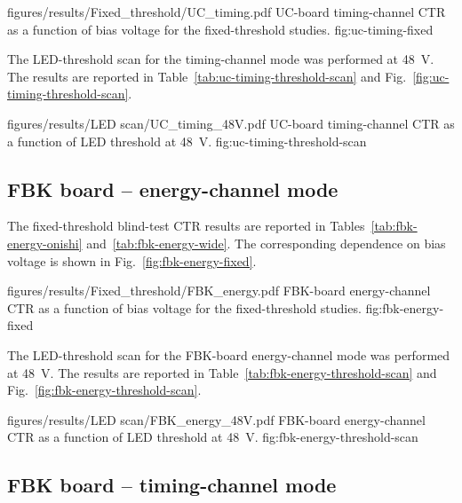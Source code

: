 



\reportfigure
    {figures/results/Fixed_threshold/UC_timing.pdf}
    {UC-board timing-channel CTR as a function of bias voltage for the fixed-threshold studies.}
    {fig:uc-timing-fixed}

The LED-threshold scan for the timing-channel mode was performed at \SI{48}{V}. The results are reported in Table~\ref{tab:uc-timing-threshold-scan} and Fig.~\ref{fig:uc-timing-threshold-scan}.



\reportfigure
    {figures/results/LED scan/UC_timing_48V.pdf}
    {UC-board timing-channel CTR as a function of LED threshold at \SI{48}{V}.}
    {fig:uc-timing-threshold-scan}


\subsection{FBK board -- energy-channel mode}

The fixed-threshold blind-test CTR results are reported in Tables~\ref{tab:fbk-energy-onishi} and~\ref{tab:fbk-energy-wide}. The corresponding dependence on bias voltage is shown in Fig.~\ref{fig:fbk-energy-fixed}.





\reportfigure
    {figures/results/Fixed_threshold/FBK_energy.pdf}
    {FBK-board energy-channel CTR as a function of bias voltage for the fixed-threshold studies.}
    {fig:fbk-energy-fixed}

The LED-threshold scan for the FBK-board energy-channel mode was performed at \SI{48}{V}. The results are reported in Table~\ref{tab:fbk-energy-threshold-scan} and Fig.~\ref{fig:fbk-energy-threshold-scan}.



\reportfigure
    {figures/results/LED scan/FBK_energy_48V.pdf}
    {FBK-board energy-channel CTR as a function of LED threshold at \SI{48}{V}.}
    {fig:fbk-energy-threshold-scan}


\subsection{FBK board -- timing-channel mode}

